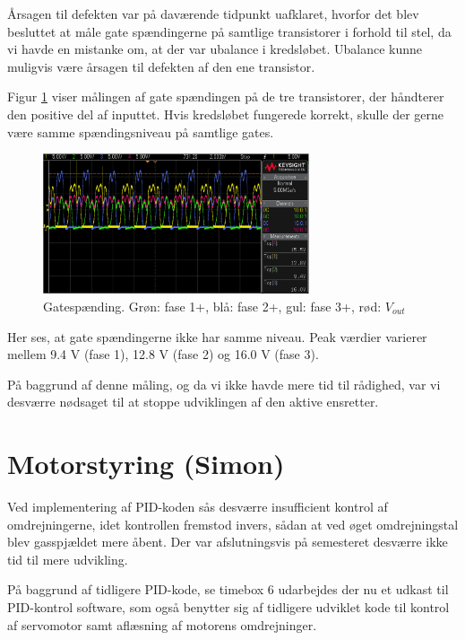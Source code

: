 Årsagen til defekten var på daværende tidpunkt uafklaret, hvorfor det blev besluttet at måle gate spændingerne på samtlige transistorer i forhold til stel, da vi havde en mistanke om, at der var ubalance i kredsløbet. Ubalance kunne muligvis være årsagen til defekten af den ene transistor. 

Figur \ref{fig:nt9} viser målingen af gate spændingen på de tre transistorer, der håndterer den positive del af inputtet. Hvis kredsløbet fungerede korrekt, skulle der gerne være samme spændingsniveau på samtlige gates. 
\clearpage
\begin{figure}[h]
  \centering
  \includegraphics[width=0.7\textwidth]{nt9.png}
  \caption{Gatespænding. Grøn: fase 1+, blå: fase 2+, gul: fase 3+, rød: $V_{out}$}
  \label{fig:nt9}
\end{figure}

Her ses, at gate spændingerne ikke har samme niveau. Peak værdier varierer mellem 9.4 V (fase 1), 12.8 V (fase 2) og 16.0 V (fase 3).

På baggrund af denne måling, og da vi ikke havde mere tid til rådighed, var vi desværre nødsaget til at stoppe udviklingen af den aktive ensretter. 


\section{Motorstyring (Simon)}
\label{sec:motorstyring}

Ved implementering af PID-koden sås desværre insufficient kontrol af omdrejningerne, idet kontrollen fremstod invers, sådan at ved øget omdrejningstal blev gasspjældet mere åbent. Der var afslutningsvis på semesteret desværre ikke tid til mere udvikling.

På baggrund af tidligere PID-kode, se timebox 6 udarbejdes der nu et udkast til PID-kontrol software, som også benytter sig af tidligere udviklet kode til kontrol af servomotor samt aflæsning af motorens omdrejninger.

  


